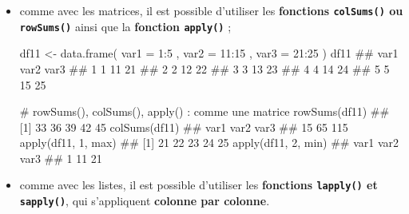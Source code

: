 \documentclass[12pt,twosided, notitlepage]{book}
\newenvironment{Shaded}{}{}
\newcommand{\KeywordTok}[1]{\textcolor[rgb]{0.00,0.00,1.00}{{#1}}}
\newcommand{\DataTypeTok}[1]{{#1}}
\newcommand{\DecValTok}[1]{{#1}}
\newcommand{\StringTok}[1]{\textcolor[rgb]{0.00,0.50,0.50}{{#1}}}
\newcommand{\CommentTok}[1]{\textcolor[rgb]{0.00,0.50,0.00}{{#1}}}
\newcommand{\NormalTok}[1]{{#1}}
\renewenvironment{Shaded}{\begin{snugshade}}{\end{snugshade}}
\begin{document}
\begin{itemize}
\item
  comme avec les matrices, il est possible d'utiliser les
  \textbf{fonctions \texttt{colSums()} ou
  \texttt{rowSums()}}
  ainsi que la \textbf{fonction \texttt{apply()}}
  ;

\begin{Shaded}
\begin{Highlighting}[]
\NormalTok{df11 <-}\StringTok{ }\KeywordTok{data.frame}\NormalTok{(}
  \DataTypeTok{var1 =} \DecValTok{1}\NormalTok{:}\DecValTok{5}
  \NormalTok{, }\DataTypeTok{var2 =} \DecValTok{11}\NormalTok{:}\DecValTok{15}
  \NormalTok{, }\DataTypeTok{var3 =} \DecValTok{21}\NormalTok{:}\DecValTok{25}
\NormalTok{)}
\NormalTok{df11}
  \NormalTok{##   var1 var2 var3}
  \NormalTok{## 1    1   11   21}
  \NormalTok{## 2    2   12   22}
  \NormalTok{## 3    3   13   23}
  \NormalTok{## 4    4   14   24}
  \NormalTok{## 5    5   15   25}

\CommentTok{# rowSums(), colSums(), apply() : comme une matrice}
\KeywordTok{rowSums}\NormalTok{(df11)}
  \NormalTok{## [1] 33 36 39 42 45}
\KeywordTok{colSums}\NormalTok{(df11)}
  \NormalTok{## var1 var2 var3 }
  \NormalTok{##   15   65  115}
\KeywordTok{apply}\NormalTok{(df11, }\DecValTok{1}\NormalTok{, max)}
  \NormalTok{## [1] 21 22 23 24 25}
\KeywordTok{apply}\NormalTok{(df11, }\DecValTok{2}\NormalTok{, min)}
  \NormalTok{## var1 var2 var3 }
  \NormalTok{##    1   11   21}
\end{Highlighting}
\end{Shaded}
\item
  comme avec les listes, il est possible d'utiliser les
  \textbf{fonctions \texttt{lapply()} et
  \texttt{sapply()}}, qui
  s'appliquent \textbf{colonne par colonne}.

\begin{Shaded}
\end{Shaded}
\end{itemize}
\end{document}
